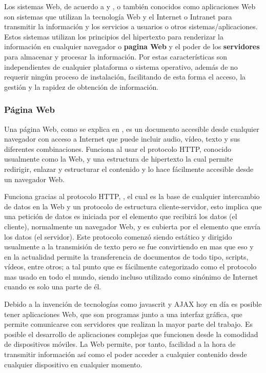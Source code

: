 Los sistemas Web, de acuerdo a \cite{SistWeb1} y \cite{wiki:systemWeb}, o
también conocidos como aplicaciones Web son sistemas que
utilizan la tecnología Web y el Internet o Intranet para transmitir la
información y los
servicios a usuarios o otros sistemas/aplicaciones. Estos sistemas utilizan los
principios del hipertexto para renderizar la información en cualquier
navegador o \textbf{pagina Web} y el poder de los \textbf{servidores} para
almacenar y procesar la información. Por estas características son independientes
de cualquier plataforma o sistema operativo, además de  no requerir ningún
proceso de instalación, facilitando de esta forma el acceso, la gestión y la
rapidez de obtención de información.



\subsubsection*{Página Web}
Una página Web, como se explica en \cite{webpageMozila},  es un documento
accesible desde cualquier navegador con acceso
a Internet que puede incluir audio, vídeo, texto y sus diferentes
combinaciones.
Funciona al usar el protocolo HTTP, conocido usualmente como la Web, y una
estructura de hipertexto la cual permite redirigir, enlazar y estructurar el
contenido y lo hace fácilmente accesible desde un navegador Web.

Funciona gracias al protocolo HTTP, ,
el cual es la base de cualquier intercambio de datos en la Web y un protocolo
de estructura cliente-servidor, esto implica que una petición de datos es
iniciada por el elemento que recibirá los datos (el cliente), normalmente un
navegador Web, y es cubierta por el elemento que envía los datos (el servidor).
Este protocolo comenzó siendo estático y dirigido usualmente a la transmisión de
texto pero se fue convirtiendo en mas que eso y en la actualidad permite la
transferencia de documentos de todo tipo, scripts, vídeos, entre otros; a tal
punto que es fácilmente categorizado como el protocolo mas usado en todo el
mundo, siendo incluso utilizado como sinónimo de Internet cuando es solo una
parte de él.

Debido a la invención de tecnologías como javascrit y AJAX hoy en día es
posible tener aplicaciones Web, que son programas junto a una interfaz gráfica,
que permite comunicarse con servidores que realizan la mayor parte del trabajo.
 Es posible el desarrollo de aplicaciones complejas que funcionen desde la
comodidad de dispositivos móviles. La Web permite, por tanto, facilidad a la hora
de transmitir información así como el poder acceder a cualquier contenido desde
cualquier dispositivo en cualquier momento.

